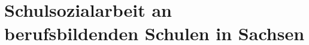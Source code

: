 \section{Schulsozialarbeit an berufsbildenden Schulen in Sachsen}
\label{sec:SchulsozialarbeitAnBerufsbildendenSchulenInSachsen}
